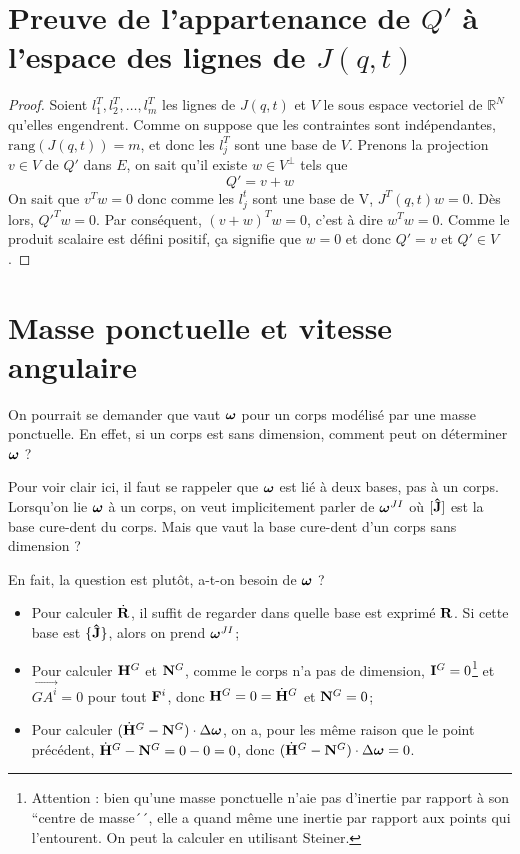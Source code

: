 \annexe
\section{Preuve de l'appartenance de $Q'$ à l'espace des lignes de $J(q, t)$}
\label{ann:orthogonal}
\begin{proof}
  Soient $l_1^T, l_2^T, \ldots, l_m^T$ les lignes de $J(q, t)$ et $V$ le sous espace vectoriel de $\mathbb{R}^N$ qu'elles engendrent.
  Comme on suppose que les contraintes sont indépendantes, $\mathrm{rang}(J(q, t)) = m$, et donc les $l_j^T$ sont une base de $V$.
  Prenons la projection $v \in V$ de $Q'$ dans $E$, on sait qu'il existe $w \in V^\perp$ tels que
  \[ Q' = v + w \]
  On sait que $v^Tw = 0$ donc comme les $l_j^t$ sont une base de V, $J^T(q, t)w = 0$.
  Dès lors, $Q'^T w = 0$.
  Par conséquent, $(v + w)^T w = 0$, c'est à dire $w^T w = 0$.
  Comme le produit scalaire est défini positif, ça signifie que $w = 0$ et donc $Q' = v$ et $Q' \in V$.
\end{proof}

\section{Masse ponctuelle et vitesse angulaire}
On pourrait se demander que vaut ${\bm \omega}$ pour un corps modélisé par une masse ponctuelle.
En effet, si un corps est sans dimension, comment peut on déterminer ${\bm \omega}$ ?

Pour voir clair ici, il faut se rappeler que ${\bm \omega}$ est lié à deux bases, pas à un corps.
Lorsqu'on lie ${\bm \omega}$ à un corps, on veut implicitement parler de ${\bm \omega}^{JI}$ où $[{\bf\hat{J}}]$ est la base cure-dent du corps.
Mais que vaut la base cure-dent d'un corps sans dimension ?

En fait, la question est plutôt, a-t-on besoin de ${\bm \omega}$ ?
\begin{itemize}
  \item Pour calculer $\dot{\bf R}$,
    il suffit de regarder dans quelle base est exprimé ${\bf R}$.
    Si cette base est $\{{\bf\hat{J}}\}$, alors on prend ${\bm \omega}^{JI}$;
  \item Pour calculer ${\bf H}^G$ et ${\bf N}^G$, comme le corps n'a pas de dimension, ${\bf I}^G = 0$\footnote{
	Attention : bien qu'une masse ponctuelle n'aie pas d'inertie par rapport à son ``centre de masse´´, elle a quand même
	une inertie par rapport aux points qui l'entourent. On peut la calculer en utilisant Steiner.} et $\vec{GA^i} = 0$ 
	pour tout ${\bf F}^i$, donc
    ${\bf H}^G = 0 = \dot{{\bf H}}^G$ et ${\bf N}^G = 0$;
  \item Pour calculer $(\dot{{\bf H}}^G - {\bf N}^G) \cdot \Delta {\bm \omega}$, on a, pour les même raison que le point précédent,
    $\dot{{\bf H}}^G - {\bf N}^G = 0 - 0 = 0$, donc $(\dot{{\bf H}}^G - {\bf N}^G) \cdot \Delta {\bm \omega} = 0$.
\end{itemize}



